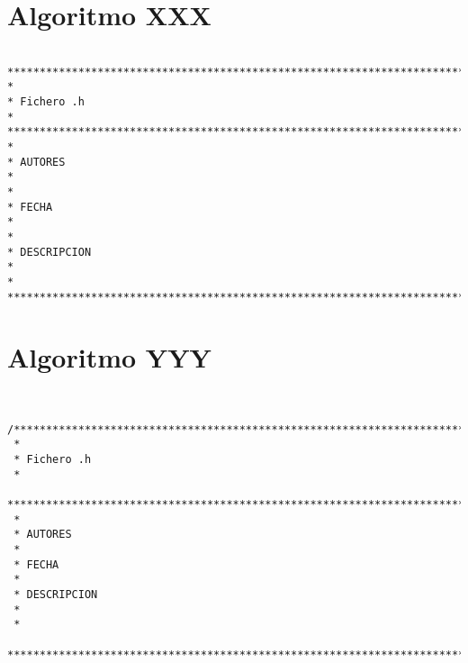 \section{Algoritmo XXX}
\label{Apendice1:XXX}

\begin{center}
\begin{footnotesize}
\begin{verbatim}

***********************************************************************************
*
* Fichero .h
*
***********************************************************************************
*
* AUTORES
*   
*
* FECHA
*   
*
* DESCRIPCION
*   
*
************************************************************************************/

\end{verbatim}
\end{footnotesize}
\end{center}

\section{Algoritmo YYY}
\label{Apendice1:YYY}

\begin{center}
\begin{footnotesize}
\begin{verbatim}


/***********************************************************************************
 *
 * Fichero .h
 *
 ***********************************************************************************
 *
 * AUTORES
 *
 * FECHA
 *
 * DESCRIPCION
 *
 *
 ************************************************************************************/

\end{verbatim}
\end{footnotesize}
\end{center}

